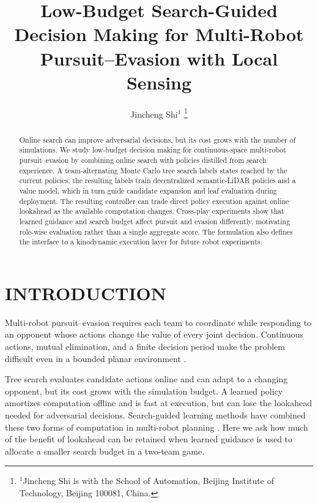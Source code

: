 \documentclass[letterpaper,10pt,conference]{ieeeconf}
\title{\LARGE\bfseries
Low-Budget Search-Guided Decision Making for Multi-Robot Pursuit--Evasion with Local Sensing
}
\author{Jincheng Shi$^{1}$ %
\thanks{$^{1}$Jincheng Shi is with the School of Automation,
        Beijing Institute of Technology, Beijing 100081, China.}%
}
\begin{document}
\maketitle
\thispagestyle{empty}
\pagestyle{empty}

\begin{abstract}
Online search can improve adversarial decisions, but its cost grows with
the number of simulations. We study low-budget decision making for
continuous-space multi-robot pursuit--evasion by combining online search
with policies distilled from search experience. A team-alternating Monte
Carlo tree search labels states reached by the current policies; the
resulting labels train decentralized semantic-LiDAR policies and a value
model, which in turn guide candidate expansion and leaf evaluation during
deployment. The resulting controller can trade direct policy execution
against online lookahead as the available computation changes. Cross-play
experiments show that learned guidance and search budget affect pursuit
and evasion differently, motivating role-wise evaluation rather than a
single aggregate score. The formulation also defines the interface to a
kinodynamic execution layer for future robot experiments.

\end{abstract}

\section{INTRODUCTION}

Multi-robot pursuit--evasion requires each team to coordinate while
responding to an opponent whose actions change the value of every joint
decision. Continuous actions, mutual elimination, and a finite decision
period make the problem difficult even in a bounded planar environment
\cite{isaacs1965differential,garcia2021multiple}.

Tree search evaluates candidate actions online and can adapt to a changing
opponent, but its cost grows with the simulation budget. A learned policy
amortizes computation offline and is fast at execution, but can lose the
lookahead needed for adversarial decisions. Search-guided learning methods
have combined these two forms of computation in multi-robot planning
\cite{riviere2021neural}. Here we ask how much of the benefit of lookahead
can be retained when learned guidance is used to allocate a smaller search
budget in a two-team game.
\end{document}
